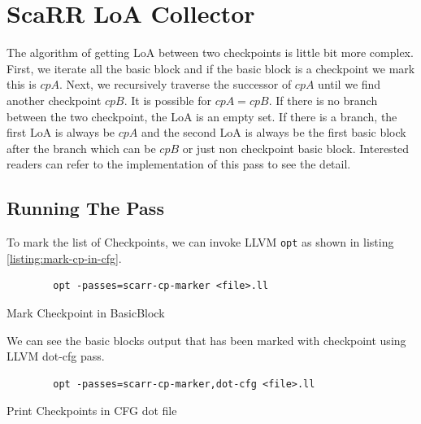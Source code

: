 \section{ScaRR LoA Collector} \label{sec:scarr-loa-collector}


The algorithm of getting LoA between two checkpoints is little bit more complex. First, we iterate all the basic block and if the basic block is a checkpoint we mark this is $cpA$. Next, we recursively traverse the successor of $cpA$ until we find another checkpoint $cpB$. It is possible for $cpA = cpB$. If there is no branch between the two checkpoint, the LoA is an empty set. If there is a branch, the first LoA is always be $cpA$ and the second LoA is always be the first basic block after the branch \textemdash{} which can be $cpB$ or just non checkpoint basic block. Interested readers can refer to the implementation of this pass to see the detail.

\subsection{Running The Pass}

To mark the list of Checkpoints, we can invoke LLVM \texttt{opt} as shown in listing \ref{listing:mark-cp-in-cfg}.

\begin{listing}[htbp]
    \begin{verbatim}
        opt -passes=scarr-cp-marker <file>.ll
    \end{verbatim}
    \caption{Mark Checkpoint in BasicBlock}    
    \label{listing:mark-cp-in-cfg}
\end{listing}

We can see the basic blocks output that has been marked with checkpoint using LLVM dot-cfg pass.

\begin{listing}[htbp]
    \begin{verbatim}
        opt -passes=scarr-cp-marker,dot-cfg <file>.ll
    \end{verbatim}
    \caption{Print Checkpoints in CFG dot file}    
    \label{listing:cp-to-cfg}
\end{listing}


